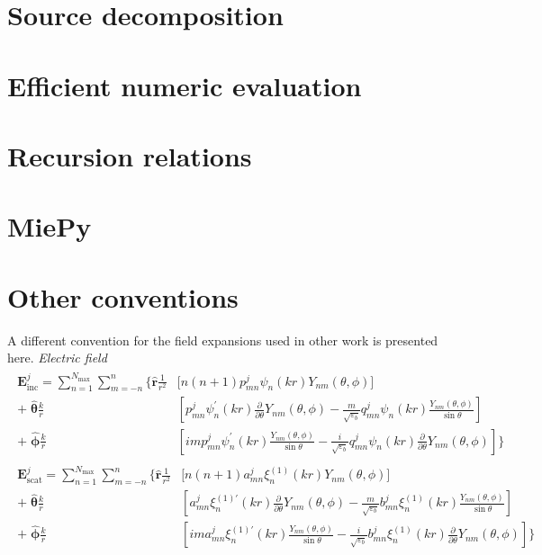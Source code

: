 \documentclass[11pt]{article}
\begin{document}
\section{Source decomposition}
\section{Efficient numeric evaluation}
\section{Recursion relations}
\section{MiePy}

\section{Other conventions}
A different convention for the field expansions used in other work \cite{barton1989theoretical} is presented here.
\textit{Electric field}
\begin{align}
\begin{split}
    \boldsymbol{E}_\text{inc}^j = \sum_{n=1}^{N_\text{max}} \sum_{m=-n}^{n} \bigg\{
    \boldsymbol{\hat r}\frac{1}{r^2} &\bigg[ n(n+1) p_{mn}^j \psi_n(kr) Y_{nm}(\theta,\phi) \bigg] \\
    +\; \boldsymbol{\hat \theta}\frac{k}{r} &\left[ p_{mn}^j \psi_n^\prime(kr) \frac{\partial}{\partial \theta} Y_{nm}(\theta,\phi)
    - \frac{m}{\sqrt{\varepsilon_b}} q_{mn}^j \psi_n(kr) \frac{Y_{nm}(\theta,\phi)}{\sin\theta} \right] \\
    +\; \boldsymbol{\hat \phi}\frac{k}{r} &\left[ im p_{mn}^j \psi_n^\prime(kr) \frac{Y_{nm}(\theta,\phi)}{\sin\theta}
    - \frac{i}{\sqrt{\varepsilon_b}} q_{mn}^j \psi_n(kr) \frac{\partial}{\partial \theta} Y_{nm}(\theta,\phi) \right] \bigg\}
\end{split}
\end{align}
\begin{align}
\begin{split}
    \boldsymbol{E}_\text{scat}^j = \sum_{n=1}^{N_\text{max}} \sum_{m=-n}^{n} \bigg\{
    \boldsymbol{\hat r}\frac{1}{r^2} &\bigg[ n(n+1) a_{mn}^j \xi_n^{(1)}(kr) Y_{nm}(\theta,\phi) \bigg] \\
    +\; \boldsymbol{\hat \theta}\frac{k}{r} &\left[ a_{mn}^j \xi_n^{(1)\prime}(kr) \frac{\partial}{\partial \theta} Y_{nm}(\theta,\phi)
    - \frac{m}{\sqrt{\varepsilon_b}} b_{mn}^j \xi_n^{(1)}(kr) \frac{Y_{nm}(\theta,\phi)}{\sin\theta} \right] \\
    +\; \boldsymbol{\hat \phi}\frac{k}{r} &\left[ im a_{mn}^j \xi_n^{(1)\prime}(kr) \frac{Y_{nm}(\theta,\phi)}{\sin\theta}
    - \frac{i}{\sqrt{\varepsilon_b}} b_{mn}^j \xi_n^{(1)}(kr) \frac{\partial}{\partial \theta} Y_{nm}(\theta,\phi) \right] \bigg\}
\end{split}
\end{align}
\end{document}
